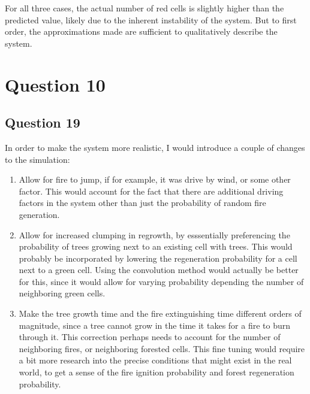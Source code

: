 \documentclass[11pt,a4paper]{article}
\begin{document}
\par For all three cases, the actual number of red cells is slightly higher than the predicted value, likely due to the inherent instability of the system. But to first order, the approximations made are sufficient to qualitatively describe the system.
\section{Question 10}
\label{sec:question10}

\subsection{Question 19}
\label{sec:question10:subsec:parta}
In order to make the system more realistic, I would introduce a couple of changes to the simulation:
\begin{enumerate}
\item Allow for fire to jump, if for example, it was drive by wind, or some other factor. This would account for the fact that there are additional driving factors in the system other than just the probability of random fire generation. 
\item Allow for increased clumping in regrowth, by esssentially preferencing the probability of trees growing next to an existing cell with trees. This would probably be incorporated by lowering the regeneration probability for a cell next to a green cell. Using the convolution method would actually be better for this, since it would allow for varying probability depending the number of neighboring green cells. 
\item Make the tree growth time and the fire extinguishing time different orders of magnitude, since a tree cannot grow in the time it takes for a fire to burn through it. This correction perhaps needs to account for the number of neighboring fires, or neighboring forested cells. This fine tuning would require a bit more research into the precise conditions that might exist in the real world, to get a sense of the fire ignition probability and forest regeneration probability.
\end{enumerate}
\end{document}

